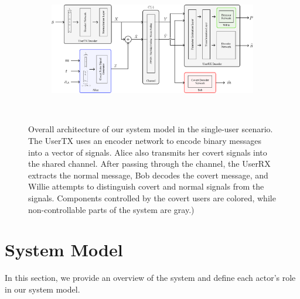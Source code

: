 \begin{figure}[thp]
	\center
	\begin{subfigure}{0.7\textwidth}
		\includegraphics[width=\linewidth]{figs/system_architecture}
	\end{subfigure}
	\\
	\caption{Overall architecture of our system model in the single-user scenario. The UserTX uses an encoder network to encode binary messages into a vector of signals. Alice also transmits her covert signals into the shared channel. After passing through the channel, the UserRX extracts the normal message, Bob decodes the covert message, and Willie attempts to distinguish covert and normal signals from the signals. Components controlled by the covert users are colored, while non-controllable parts of the system are gray.)}	
	\label{fig:system_architecture}
\end{figure}


\section{System Model}
\label{s:single-model}
In this section, we provide an overview of the system and define each actor's role in our system model.

